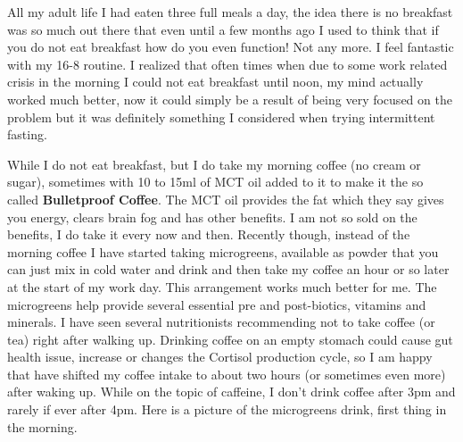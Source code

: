 \documentclass[
  oneside]{book}
\begin{document}
All my adult life I had eaten three full meals a day, the idea there is no breakfast was so much out there that even until a few months ago I used to think that if you do not eat breakfast how do you even function! Not any more. I feel fantastic with my 16-8 routine. I realized that often times when due to some work related crisis in the morning I could not eat breakfast until noon, my mind actually worked much better, now it could simply be a result of being very focused on the problem but it was definitely something I considered when trying intermittent fasting.

While I do not eat breakfast, but I do take my morning coffee (no cream or sugar), sometimes with 10 to 15ml of MCT oil added to it to make it the so called \textbf{Bulletproof Coffee}. The MCT oil provides the fat which they say gives you energy, clears brain fog and has other benefits. I am not so sold on the benefits, I do take it every now and then. Recently though, instead of the morning coffee I have started taking microgreens, available as powder that you can just mix in cold water and drink and then take my coffee an hour or so later at the start of my work day. This arrangement works much better for me. The microgreens help provide several essential pre and post-biotics, vitamins and minerals. I have seen several nutritionists recommending not to take coffee (or tea) right after walking up. Drinking coffee on an empty stomach could cause gut health issue, increase or changes the Cortisol production cycle, so I am happy that have shifted my coffee intake to about two hours (or sometimes even more) after waking up. While on the topic of caffeine, I don't drink coffee after 3pm and rarely if ever after 4pm. Here is a picture of the microgreens drink, first thing in the morning.
\end{document}
